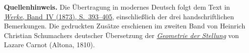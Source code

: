 \par\medskip\begin{small}\noindent\textbf{Quellenhinweis.} Die Übertragung in modernes Deutsch folgt dem Text in \href{https://gdz.sub.uni-goettingen.de/id/PPN236005081}{\textit{Werke}, Band~IV (1873), S.~393--405}, einschließlich der drei handschriftlichen Bemerkungen. Die gedruckten Zusätze erschienen im zweiten Band von Heinrich Christian Schumachers deutscher Übersetzung der \href{https://doi.org/10.3931/e-rara-56170}{\textit{Geometrie der Stellung}} von Lazare Carnot (Altona, 1810).\par\end{small}
